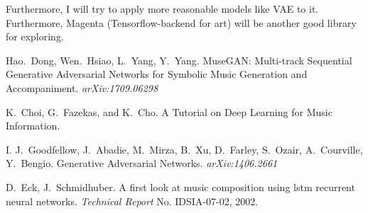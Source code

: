 \documentclass[journal, a4paper]{IEEEtran}
\begin{document}
Furthermore, I will try to apply more reasonable models like VAE to it. Furthermore, Magenta (Tensorflow-backend for art) will be another good library for exploring.

\begin{thebibliography}{5}

	Hao.~Dong, Wen.~Hsiao, L.~Yang, Y.~Yang. MuseGAN: Multi-track Sequential Generative Adversarial Networks for Symbolic Music Generation and Accompaniment. {\em arXiv:1709.06298}

	K.~Choi, G.~Fazekas, and K.~Cho. A Tutorial on Deep Learning for Music Information.

	I. J.~Goodfellow, J.~Abadie, M.~Mirza, B.~Xu, D.~Farley, S.~Ozair, A.~Courville, Y.~Bengio. Generative Adversarial Networks. {\em arXiv:1406.2661}

    D.~Eck, J.~Schmidhuber. A first look at music composition using lstm recurrent neural networks. {\em Technical Report} No. IDSIA-07-02, 2002.


\end{thebibliography}

\end{document}
